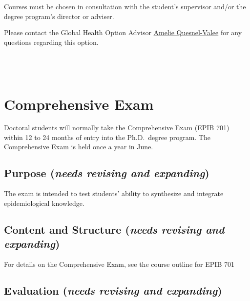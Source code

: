 \documentclass[
]{book}
\begin{document}
Courses must be chosen in consultation with the student's supervisor and/or the degree program's director or adviser.

Please contact the Global Health Option Advisor \href{mailto:amelie.quesnelvallee@mcgill.ca}{Amelie Quesnel-Valee} for any questions regarding this option.

\hypertarget{section-3}{%
\section{---}\label{section-3}}

\hypertarget{comprehensive-exam}{%
\chapter{Comprehensive Exam}\label{comprehensive-exam}}

Doctoral students will normally take the Comprehensive Exam (EPIB 701) within 12 to 24 months of entry into the Ph.D.~degree program. The Comprehensive Exam is held once a year in June.

\hypertarget{purpose-needs-revising-and-expanding}{%
\section{\texorpdfstring{Purpose (\emph{needs revising and expanding})}{Purpose (needs revising and expanding)}}\label{purpose-needs-revising-and-expanding}}

The exam is intended to test students' ability to synthesize and integrate epidemiological knowledge.

\hypertarget{content-and-structure-needs-revising-and-expanding}{%
\section{\texorpdfstring{Content and Structure (\emph{needs revising and expanding})}{Content and Structure (needs revising and expanding)}}\label{content-and-structure-needs-revising-and-expanding}}

For details on the Comprehensive Exam, see the course outline for EPIB 701

\hypertarget{evaluation-needs-revising-and-expanding}{%
\section{\texorpdfstring{Evaluation (\emph{needs revising and expanding})}{Evaluation (needs revising and expanding)}}\label{evaluation-needs-revising-and-expanding}}
\end{document}
